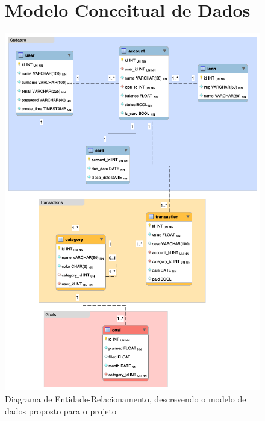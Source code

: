 \documentclass[a4paper]{abnt}
\begin{document}
\begin{figure}
	\section{Modelo Conceitual de Dados}
	\label{sec:mod_dados}
	\centering
	\includegraphics[scale=0.6]{diagramas/er.png}
	\caption{Diagrama de Entidade-Relacionamento, descrevendo o modelo de dados proposto para o projeto}
\end{figure}

\printbibliography
\end{document}
